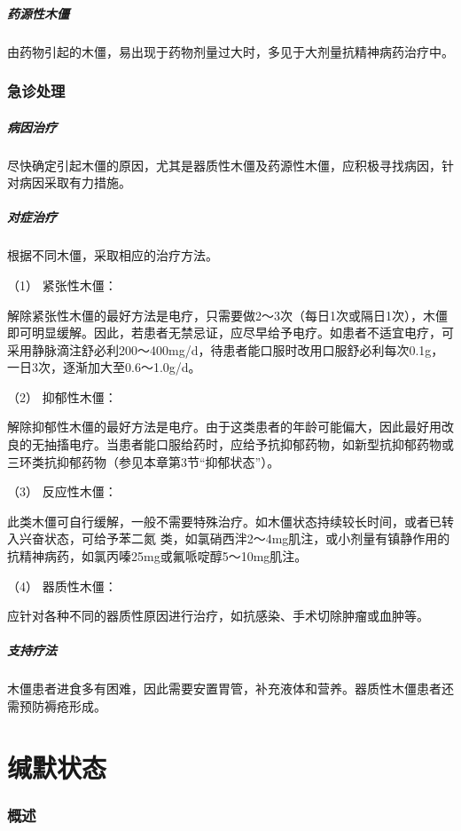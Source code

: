 \subparagraph{药源性木僵}

由药物引起的木僵，易出现于药物剂量过大时，多见于大剂量抗精神病药治疗中。

\subsubsection{急诊处理}

\subparagraph{病因治疗}

尽快确定引起木僵的原因，尤其是器质性木僵及药源性木僵，应积极寻找病因，针对病因采取有力措施。

\subparagraph{对症治疗}

根据不同木僵，采取相应的治疗方法。

\hypertarget{text00046.htmlux5cux23CHP1-18-4-3-2-1}{}
（1） 紧张性木僵：

解除紧张性木僵的最好方法是电疗，只需要做2～3次（每日1次或隔日1次），木僵即可明显缓解。因此，若患者无禁忌证，应尽早给予电疗。如患者不适宜电疗，可采用静脉滴注舒必利200～400mg/d，待患者能口服时改用口服舒必利每次0.1g，一日3次，逐渐加大至0.6～1.0g/d。

\hypertarget{text00046.htmlux5cux23CHP1-18-4-3-2-2}{}
（2） 抑郁性木僵：

解除抑郁性木僵的最好方法是电疗。由于这类患者的年龄可能偏大，因此最好用改良的无抽搐电疗。当患者能口服给药时，应给予抗抑郁药物，如新型抗抑郁药物或三环类抗抑郁药物（参见本章第3节“抑郁状态”）。

\hypertarget{text00046.htmlux5cux23CHP1-18-4-3-2-3}{}
（3） 反应性木僵：

此类木僵可自行缓解，一般不需要特殊治疗。如木僵状态持续较长时间，或者已转入兴奋状态，可给予苯二氮{}
类，如氯硝西泮2～4mg肌注，或小剂量有镇静作用的抗精神病药，如氯丙嗪25mg或氟哌啶醇5～10mg肌注。

\hypertarget{text00046.htmlux5cux23CHP1-18-4-3-2-4}{}
（4） 器质性木僵：

应针对各种不同的器质性原因进行治疗，如抗感染、手术切除肿瘤或血肿等。

\subparagraph{支持疗法}

木僵患者进食多有困难，因此需要安置胃管，补充液体和营养。器质性木僵患者还需预防褥疮形成。

\protect\hypertarget{text00047.html}{}{}

\section{缄默状态}

\subsubsection{概述}

